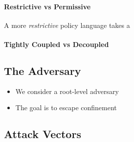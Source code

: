 \paragraph*{Restrictive vs Permissive} A more \textit{restrictive} policy language
takes a

\paragraph*{Tightly Coupled vs Decoupled}

\subsection{The Adversary}

\begin{inprogress}
  \begin{itemize}
    \item We consider a root-level adversary
    \item The goal is to escape confinement
  \end{itemize}
\end{inprogress}

\subsection{Attack Vectors}

